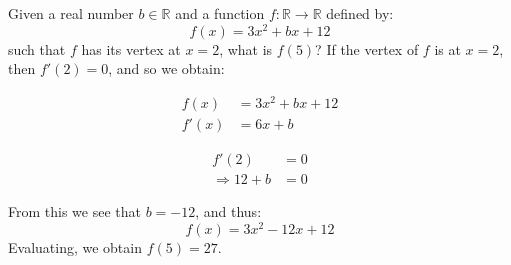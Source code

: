 \documentclass[crop=false,class=book,oneside]{standalone}                      %
\begin{document}
            \begin{lexample}
                Given a real number $b\in\mathbb{R}$ and a function
                $f:\mathbb{R}\rightarrow\mathbb{R}$ defined by:
                \begin{equation}
                    f(x)=3x^{2}+bx+12
                \end{equation}
                such that $f$ has its vertex at $x=2$, what is $f(5)$?
                If the vertex of $f$ is at $x=2$, then $f'(2)=0$,
                and so we obtain:
                \par
                \begin{minipage}[b]{0.49\textwidth}
                    \begin{align}
                        f(x)&=3x^{2}+bx+12\\
                        f'(x)&=6x+b
                    \end{align}
                \end{minipage}
                \hfill
                \begin{minipage}[b]{0.49\textwidth}
                    \begin{align}
                        f'(2)&=0\\
                        \Rightarrow
                        12+b&=0
                    \end{align}
                \end{minipage}
                \par
                From this we see that $b=-12$, and thus:
                \begin{equation}
                    f(x)=3x^{2}-12x+12
                \end{equation}
                Evaluating, we obtain $f(5)=27$.
            \end{lexample}
\end{document}
